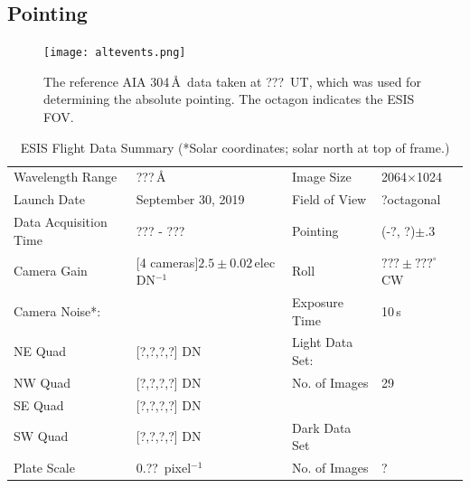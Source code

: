	\subsection{Pointing} \label{sec:point}
		
		\begin{figure}[ht]
			\begin{center}
				\texttt{[image: altevents.png]}
				\caption{The reference AIA 304\,\AA\ data taken at ???~UT, which was used for determining the absolute pointing. The octagon indicates the ESIS FOV.}
				\label{fig:fov}
			\end{center}
		\end{figure}
	
		\begin{center}
			\begin{table}
				\caption{ESIS Flight Data Summary (*Solar coordinates; solar north at top of frame.)}
				\label{tab:data_info}
				\begin{tabular}{ll | l l}\hline
					Wavelength Range &   ???\,\AA\  & Image Size  & 2064$\times$1024\\
					Launch Date & September 30, 2019 & Field of View  & ?\arcmin octagonal \\
					Data Acquisition Time & ??? - ??? & Pointing  & (-?\arcsec, ?\arcsec)$\pm .3$\arcsec  \\
					Camera Gain &   [4 cameras]$2.5 \pm 0.02$\,elec DN$^{-1}$ & Roll & $??? \pm ???^\circ$ CW \\
					Camera Noise*: & & Exposure Time & 10\,s\\
					\hspace{0.2in}NE Quad & [?,?,?,?] DN & Light Data Set: &\\
					\hspace{0.2in}NW Quad & [?,?,?,?] DN & \hspace{0.2in}No. of Images & 29\\
					\hspace{0.2in}SE Quad  & [?,?,?,?] DN & &\\
					\hspace{0.2in}SW Quad  & [?,?,?,?] DN & Dark Data Set & \\
					Plate Scale  & 0.??\arcsec\ pixel$^{-1}$ &  \hspace{0.2in}No. of Images & ? \\
					\hline
				\end{tabular}
			\end{table}
		\end{center}
		

